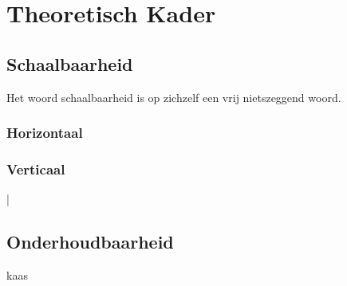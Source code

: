 \chapter{Theoretisch Kader}
\label{Chapter2}

\section{Schaalbaarheid}

Het woord schaalbaarheid is op zichzelf een vrij nietszeggend woord.

\subsection{Horizontaal}

\subsection{Verticaal}|

\section{Onderhoudbaarheid}
kaas